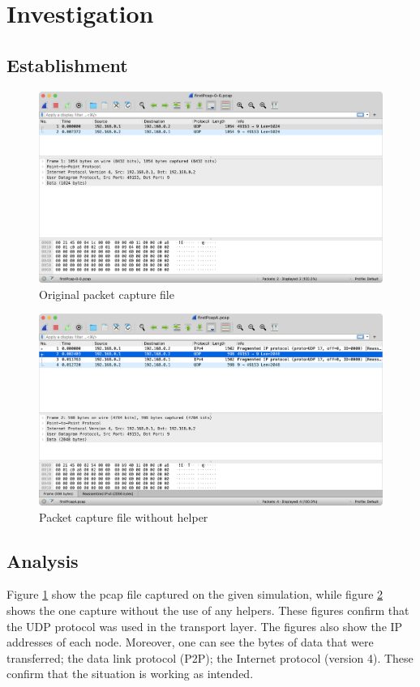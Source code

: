 \documentclass[a4paper, 12pt]{article}
\begin{document}
\section{Investigation}
\label{section:investigation}

\subsection{Establishment}
\begin{figure}[hbt]
 \includegraphics[width=\textwidth,height=\textheight,keepaspectratio]{./images/firstpcap0}
  \caption{Original packet capture file}
  \label{fig:firstpcap0}
\end{figure}

\begin{figure}[hbt]
 \includegraphics[width=\textwidth,height=\textheight,keepaspectratio]{./images/firstpcapa}
  \caption{Packet capture file without helper}
  \label{fig:firstpcapa}
\end{figure}

\subsection{Analysis}
Figure \ref{fig:firstpcap0} show the pcap file captured on the given simulation, while figure \ref{fig:firstpcapa} shows the one capture without the use of any helpers. These figures confirm that the UDP protocol was used in the transport layer. The figures also show the IP addresses of each node. Moreover, one can see the bytes of data that were transferred; the data link protocol (P2P); the Internet protocol (version 4). These confirm that the situation is working as intended.
\end{document}
